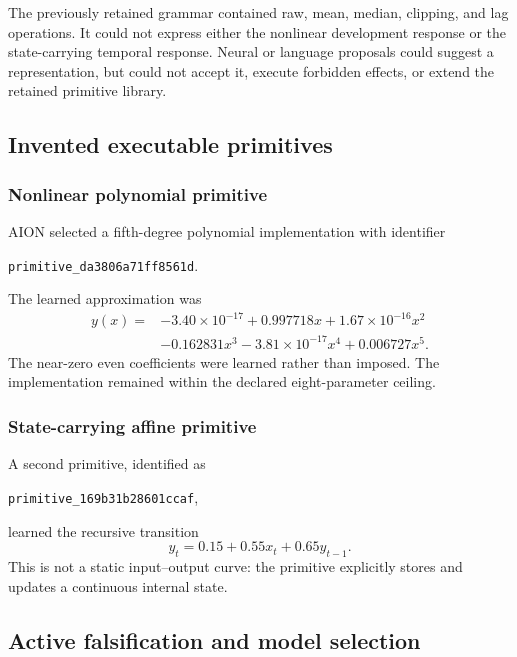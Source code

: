The previously retained grammar contained raw, mean, median, clipping, and lag
operations.  It could not express either the nonlinear development response or
the state-carrying temporal response.  Neural or language proposals could
suggest a representation, but could not accept it, execute forbidden effects,
or extend the retained primitive library.


\subsection{Invented executable primitives}
\label{subsec:arena-v5-primitives}

\subsubsection{Nonlinear polynomial primitive}

AION selected a fifth-degree polynomial implementation with identifier
\begin{center}
\texttt{primitive\_da3806a71ff8561d}.
\end{center}
The learned approximation was
\begin{equation}
\begin{split}
y(x)={}&-3.40\times 10^{-17}
       +0.997718x
       +1.67\times 10^{-16}x^2 \\
     &-0.162831x^3
       -3.81\times 10^{-17}x^4
       +0.006727x^5.
\end{split}
\label{eq:arena-v5-polynomial}
\end{equation}
The near-zero even coefficients were learned rather than imposed.  The
implementation remained within the declared eight-parameter ceiling.


\subsubsection{State-carrying affine primitive}

A second primitive, identified as
\begin{center}
\texttt{primitive\_169b31b28601ccaf},
\end{center}
learned the recursive transition
\begin{equation}
y_t=0.15+0.55x_t+0.65y_{t-1}.
\label{eq:arena-v5-stateful}
\end{equation}
This is not a static input--output curve: the primitive explicitly stores and
updates a continuous internal state.


\subsection{Active falsification and model selection}
\label{subsec:arena-v5-falsification}

